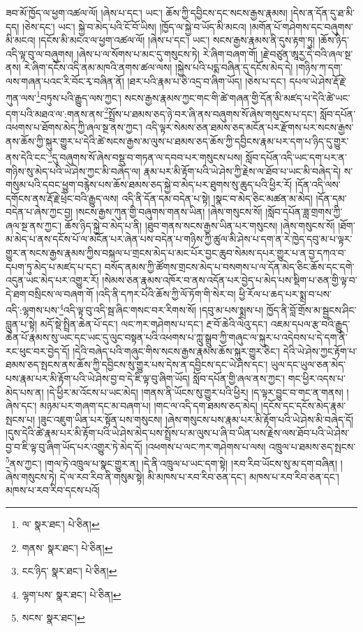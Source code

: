 ཟབ་མོ་ཁྱོད་ལ་ཕྱག་འཚལ་ལོ། །ཞེས་པ་དང་། ཡང་། ཆོས་ཀྱི་དབྱིངས་དང་སངས་རྒྱས་རྣམས། །དེས་ན་དོན་དུ་ཐ་མི་དད། །ཅེས་དང་། ཡང་། སྐྱེ་བ་མེད་པའི་ངོ་བོ་ཡིས། །ཁྱོད་ལ་སྐྱེ་བ་ཡོད་མི་མངའ། །མགོན་པོ་གཤེགས་དང་བཞུགས་མི་མངའ། །དངོས་མི་མངའ་ལ་ཕྱག་འཚལ་ལོ། །ཞེས་པ་དང་། ཡང་། སངས་རྒྱས་རྣམས་ནི་དུས་རྟག་ཏུ། །ཆོས་ཉིད་འདི་ལྟ་བུ་ལ་བཞུགས། །ཞེས་པ་ལ་སོགས་པ་མང་དུ་གསུངས་ཏེ། རེ་ཞིག་བཞག་གོ། །རྗེ་བཙུན་ཨཱརྱ་དེ་བའི་ཞལ་སྔ་ནས། རེ་ཞིག་དངོས་འདི་ནམ་མཁའི་ནགས་ཚལ་ལས། །སྐྱེས་པའི་པདྨ་བཞིན་དུ་དངོས་མེད་དེ། །གཉིས་ཀ་དག་ལས་གཞན་པའང་རི་བོང་རྭ་བཞིན་ནོ། །ཐར་པའི་རྣམ་པ་ཅི་འདྲ་བ་ཞིག་ཡོད། །ཅེས་པ་དང་། དཔལ་ཡེ་ཤེས་རྡོ་རྗེ་ཀུན་ལས་\footnote{ལ་  སྣར་ཐང་།  པེ་ཅིན། }བཏུས་པའི་རྒྱུད་ལས་ཀྱང་། སངས་རྒྱས་རྣམས་ཀྱང་གང་གི་ཚེ་གཞན་གྱི་དོན་མི་མཛད་པ་དེའི་ཚེ་ཡང་དག་པའི་མཐའ་ལ་:གནས་ནས་\footnote{གནས་  སྣར་ཐང་།  པེ་ཅིན། }སྤྲོས་པ་ཐམས་ཅད་ཉེ་བར་ཞི་ནས་བཞུགས་སོ་ཞེས་གསུངས་པ་དང་། སློབ་དཔོན་འཕགས་པ་ཐོགས་མེད་ཀྱི་ཞལ་སྔ་ནས་ཀྱང་། འདི་ལྟར་སེམས་ཅན་ཐམས་ཅད་མངོན་པར་རྫོགས་པར་སངས་རྒྱས་ནས་ཆོས་ཀྱི་སྐུར་གྱུར་པ་དེའི་ཚེ་སངས་རྒྱས་མ་ལུས་པ་ཐམས་ཅད་ཆོས་ཀྱི་དབྱིངས་རྣམ་པར་དག་པ་ཉིད་དུ་གྱུར་ནས་དེའི་ངང་\footnote{ངང་ཉིད་  སྣར་ཐང་།  པེ་ཅིན། }དུ་བཞུགས་སོ་ཞེས་བསྡུ་བ་གཏན་ལ་དབབ་པར་གསུངས་པས། སློབ་དཔོན་འདི་ཡང་དག་པར་ན་གཉིས་སུ་མེད་པའི་ཡེ་ཤེས་ཀྱང་མི་བཞེད་ལ། རྣམ་པར་མི་རྟོག་པའི་ཡེ་ཤེས་ཀྱི་རྗེས་ལ་ཐོབ་པ་ཡང་མི་བཞེད་དེ། ས་གསུམ་པའི་དབང་ཕྱུག་བརྙེས་པས་ཆོས་ཐམས་ཅད་སྐྱེ་བ་མེད་པར་ཐུགས་སུ་ཆུད་པའི་ཕྱིར་རོ། །དོན་འདི་ལས་དགོངས་ནས་རྡོ་རྗེ་ཕྲེང་བའི་རྒྱུད་ལས། འདི་ནི་དོན་དམ་བདེན་པ་སྟེ། །སྣང་བ་མེད་ཅིང་མཚན་མ་མེད། །དོན་དམ་བདེན་པ་ཞེས་ཀྱང་བྱ། །སངས་རྒྱས་ཀུན་གྱི་བཞུགས་གནས་ཡིན། །ཞེས་གསུངས་སོ། །སློབ་དཔོན་ཟླ་གྲགས་ཀྱི་ཞལ་སྔ་ནས་ཀྱང་། ཆོས་ཉིད་སྐྱེ་བ་མེད་པ་ནི། །ཐུབ་གནས་སངས་རྒྱས་ཡིན་པར་གསུངས། །ཞེས་གསུངས་སོ། །ཐོག་མ་མེད་པ་ནས་དངོས་པོ་ལ་མངོན་པར་ཞེན་པས་བདེན་པ་གཉིས་ཀྱི་ཚུལ་མི་ཤེས་པ་དག་ན་རེ་ཁྱེད་དབུ་མ་པ་ལྟར་གྱུར་ན་སངས་རྒྱས་རྣམས་ཀྱིས་བསྐལ་པ་གྲངས་མེད་པ་མང་པོར་བྱང་ཆུབ་སེམས་དཔར་གྱུར་པ་ན་བྱ་དཀའ་བ་དཔག་ཏུ་མེད་པ་མཛད་པ་དང་། བསོད་ནམས་ཀྱི་ཚོགས་གྲངས་མེད་པ་བསགས་པ་ལ་དོན་མེད་ཅིང་ཆོས་དང་དགེ་འདུན་ཡང་མེད་པར་འགྱུར་རོ། །སེམས་ཅན་རྣམས་འཁོར་བ་ནས་འདོན་པར་བྱེད་པ་མེད་པས་སྡིག་པ་ཅན་གྱི་ལྟ་བ་དེ་ཐག་བསྲིངས་ལ་བཞག་གོ །འདི་ནི་དཀར་པོའི་ཆོས་ཀྱི་ལོ་ཏོག་གི་སེར་བ། ཕྱི་རོལ་པ་ཆད་པར་སྨྲ་བ་པས་འདི་:ལྷགས་པས་\footnote{ལྷག་པས་  སྣར་ཐང་།  པེ་ཅིན། }འདི་ལྟ་བུ་འདི་སྦ་ཞིང་གསང་བར་རིགས་སོ། །དབུ་མ་པས་སྨྲས་པ། ཁྱོད་ནི་བློ་གྲོས་མ་སྦྱངས་ཤིང་བླུན་པ་སྟེ། མདོ་སྡེ་སྤྲིན་ཆེན་པོ་དང་། ལང་ཀར་གཤེགས་པ་དང་། རྔ་བོ་ཆེའི་ལེའུ་དང་། འཇམ་དཔལ་རྩ་བའི་རྒྱུད་ཆེན་པོ་རྣམས་སུ་ཡང་དང་ཡང་དུ་ལུང་བསྟན་པའི་འཕགས་པ་ཀླུ་སྒྲུབ་ཀྱི་གཞུང་ལ་སྐུར་པ་འདེབས་པ་དེ་དག་ནི་རང་ཕུང་བར་བྱེད་དོ། །དེའི་བཞེད་པའི་གཞུང་གིས་སངས་རྒྱས་རྣམས་ཆོས་སྐུར་གྱུར་ཅིང་། དེའི་ཡེ་ཤེས་ཀྱང་རྟོག་པ་ཐམས་ཅད་སྤངས་ནས་ཆོས་ཀྱི་དབྱིངས་སུ་གྱུར་པས་དེས་ན་དབྱིངས་དང་ཡེ་ཤེས་དང་། ཡུལ་དང་ཡུལ་ཅན་མེད་པས་རྣམ་པར་མི་རྟོག་པའི་ཡེ་ཤེས་བྱ་བ་དེ་ཇི་ལྟ་བུ་ཞིག་ཡོད། སློབ་དཔོན་གྱི་ཞལ་ནས་ཀྱང་། གང་ཕྱིར་འདས་པ་མེད་པས་ན། །དེ་ཕྱིར་མ་འོངས་པ་ཡང་མེད། །གནས་ནི་ཡོངས་སུ་གྱུར་པའི་ཕྱིར། །ད་ལྟར་བྱུང་བ་གང་ན་གནས། །ཞེས་དང་། མཉམ་པར་གཞག་དང་མ་བཞག་པ། །གང་ལ་འདི་དག་ཐམས་ཅད་མེད། །དངོས་དང་དངོས་མེད་རྣམ་སྤངས་པ། །ཟུང་འཇུག་ཡིན་པར་སྟོན་པས་གསུངས། །ཞེས་གསུངས་པས་རྣམ་པར་མི་རྟོག་པའི་ཡེ་ཤེས་མི་བཞེད་དོ། །དུས་དེའི་ཚེ་རྣམ་པར་མི་རྟོག་པའི་ཡེ་ཤེས་མེད་པས་སྤྲོས་པ་མ་ལུས་པ་ཞི་བ་ཡིན་པས་རྗེས་ལས་ཐོབ་པའི་ཡེ་ཤེས་བྱ་བ་ཇི་ལྟ་བུ་ཞིག་ཡོད་པར་འགྱུར་ཏེ་མེད་དོ། །འཕགས་པ་ལང་ཀར་གཤེགས་པ་ལས། འཁྲུལ་པ་ཐམས་ཅད་སྤངས་\footnote{སངས་  སྣར་ཐང་། }ནས་ཀྱང་། །གལ་ཏེ་འཁྲུལ་པ་སྣང་གྱུར་ན། །དེ་ནི་འཁྲུལ་པ་ཡང་དག་སྟེ། །རབ་རིབ་ཡོངས་སུ་མ་དག་བཞིན། །ཞེས་གསུངས་ཏེ། དེ་ལ་རབ་རིབ་ནི་གསུམ་སྟེ། མི་མཁས་པ་རབ་རིབ་ཅན་དང་། མཁས་པ་རབ་རིབ་ཅན་དང་། མཁས་པ་རབ་རིབ་དངས་པའོ། 